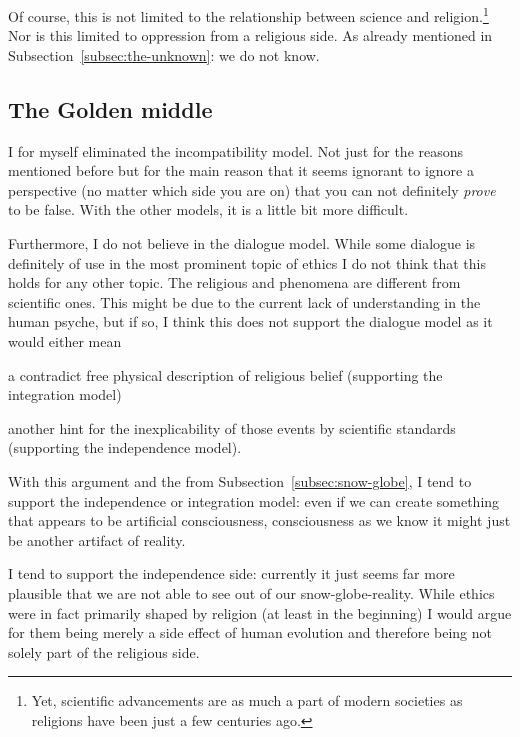 Of course, this is not limited to the relationship between science and religion.\footnote{Yet, scientific advancements are as much a part of modern societies as religions have been just a few centuries ago.} Nor is this limited to oppression from a religious side. As already mentioned in Subsection~\ref{subsec:the-unknown}: we do not know.


\subsection{The Golden middle}
\label{subsec:golden-middle}
I for myself eliminated the incompatibility model. Not just for the reasons mentioned before but for the main reason that it seems ignorant to ignore a perspective (no matter which side you are on) that you can not definitely \emph{prove} to be false.
With the other models, it is a little bit more difficult.

Furthermore, I do not believe in the dialogue model. While some dialogue is definitely of use in the most prominent topic of ethics I do not think that this holds for any other topic. The religious  and phenomena are different from scientific ones. This might be due to the current lack of understanding in the human psyche, but if so, I think this does not support the dialogue model as it would either mean \begin{orlist}
    \item a contradict free physical description of religious belief (supporting the integration model)
    \item another hint for the inexplicability of those events by scientific standards (supporting the independence model).
\end{orlist}

With this argument and the  from Subsection~\ref{subsec:snow-globe}, I tend to support the independence or integration model: even if we can create something that appears to be artificial consciousness, consciousness as we know it might just be another artifact of  reality.

I tend to support the independence side: currently it just seems far more plausible that we are not able to see out of our snow-globe-reality.
While ethics were in fact primarily shaped by religion (at least in the beginning) I would argue for them being merely a side effect of human evolution and therefore being not solely part of the religious side.